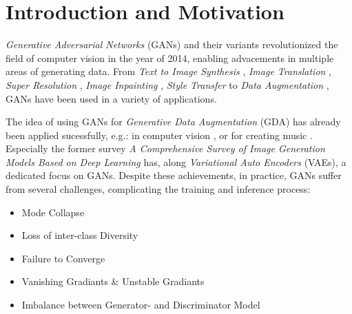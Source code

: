 \section{Introduction and Motivation}\label{introduction_and_motivation}
\pagestyle{fancy}
\textit{Generative Adversarial Networks} (GANs) \cite{goodfellow2014generativeadversarialnetworks} and their variants revolutionized the field of computer vision in the year of 2014, enabling advacements in multiple areas of generating data. From \textit{Text to Image Synthesis} \cite{reed2016generativeadversarialtextimage}, \textit{Image Translation} \cite{isola2018imagetoimagetranslationconditionaladversarial}, \textit{Super Resolution} \cite{ledig2017photorealisticsingleimagesuperresolution}, \textit{Image Inpainting} \cite{pathak2016contextencodersfeaturelearning}, \textit{Style Transfer} \cite{wang2023multimodalityguidedimagestyletransfer} to \textit{Data Augmentation} \cite{shorten2019survey}, GANs have been used in a variety of applications.

The idea of using GANs for \textit{Generative Data Augmentation} (GDA) has already been applied sucessfully, e.g.: in computer vision \cite{Li2025comprehensivesurvedeepimages}, \cite{biswas2023generativeadversarialnetworksdata} or for creating music \cite{ji2020comprehensivesurveydeepmusic}. Especially the former survey \textit{A Comprehensive Survey of Image Generation Models Based on Deep Learning} has, along \textit{Variational Auto Encoders} (VAEs), a dedicated focus on GANs. Despite these achievements, in practice, GANs suffer from several challenges, complicating the training and inference process:

\begin{itemize}\label{problems_of_gans}
    \setlength{\itemsep}{-5pt}
    \item Mode Collapse
    \item Loss of inter-class Diversity
    \item Failure to Converge
    \item Vanishing Gradiants \& Unstable Gradiants
    \item Imbalance between Generator- and Discriminator Model
\end{itemize}


